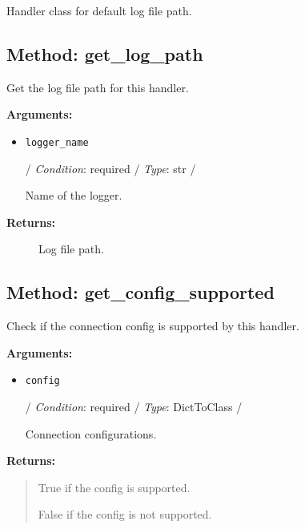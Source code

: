 \begin{Shaded}
\begin{Highlighting}[]
\end{Highlighting}
\end{Shaded}

Handler class for default log file path.

\hypertarget{qconnectbase-qlogger-method-get_log_path-1-49}{%
\subsection{Method: get\_log\_path}\label{qconnectbase-qlogger-method-get_log_path-1-49}}

Get the log file path for this handler.

\textbf{Arguments:}

\begin{itemize}
\item
  \texttt{logger\_name}

  / \emph{Condition}: required / \emph{Type}: str /

  Name of the logger.
\end{itemize}

\begin{description}
\item[\textbf{Returns:}]
Log file path.
\end{description}

\hypertarget{qconnectbase-qlogger-method-get_config_supported-1-50}{%
\subsection{Method:
get\_config\_supported}\label{qconnectbase-qlogger-method-get_config_supported-1-50}}

Check if the connection config is supported by this handler.

\textbf{Arguments:}

\begin{itemize}
\item
  \texttt{config}

  / \emph{Condition}: required / \emph{Type}: DictToClass /

  Connection configurations.
\end{itemize}

\textbf{Returns:}

\begin{quote}
True if the config is supported.

False if the config is not supported.
\end{quote}

